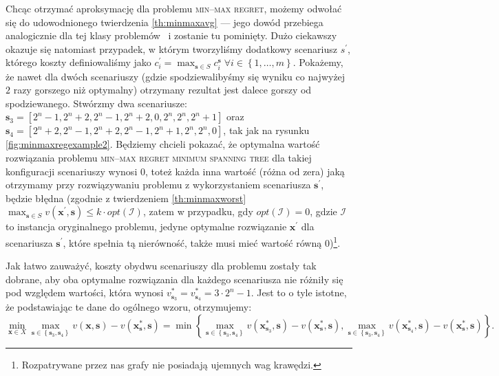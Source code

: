 Chcąc otrzymać aproksymację dla problemu \textsc{min--max regret}, możemy odwołać się do udowodnionego twierdzenia \ref{th:minmaxavg} --- jego dowód przebiega analogicznie dla tej klasy problemów~\cite[$430$]{minmaxSurvey} i zostanie tu pominięty. Dużo ciekawszy okazuje się natomiast przypadek, w którym tworzyliśmy dodatkowy scenariusz $s^{\prime}$, którego koszty definiowaliśmy jako $c^{\prime}_{i} = \max_{\textbf{s} \in S} c^{\textbf{s}}_{i} \; \forall i \in \left\{ 1, \dots, m \right\}$. Pokażemy, że nawet dla dwóch scenariuszy (gdzie spodziewalibyśmy się wyniku co najwyżej $2$ razy gorszego niż optymalny) otrzymany rezultat jest dalece gorszy od spodziewanego. Stwórzmy dwa scenariusze: $\textbf{s}_{3} = \left[ 2^{n} - 1, 2^{n} + 2, 2^{n} - 1, 2^{n} + 2, 0, 2^{n}, 2^{n}, 2^{n} + 1 \right]$ oraz $\textbf{s}_{4} = \left[ 2^{n} + 2, 2^{n} - 1, 2^{n} + 2, 2^{n} - 1, 2^{n} + 1, 2^{n}, 2^{n}, 0 \right]$, tak jak na rysunku \ref{fig:minmaxregexample2}. Będziemy chcieli pokazać, że optymalna wartość rozwiązania problemu \textsc{min--max regret minimum spanning tree} dla takiej konfiguracji scenariuszy wynosi $0$, toteż każda inna wartość (różna od zera) jaką otrzymamy przy rozwiązywaniu problemu z wykorzystaniem scenariusza $\textbf{s}^{\prime}$, będzie błędna (zgodnie z twierdzeniem \ref{th:minmaxworst} $\max_{\textbf{s} \in S} v \left( \textbf{x}^{\prime}, \textbf{s} \right) \leqslant k \cdot opt \left( \mathcal{I} \right)$, zatem w przypadku, gdy $opt \left( \mathcal{I} \right) = 0$, gdzie $\mathcal{I}$ to instancja oryginalnego problemu, jedyne optymalne rozwiązanie $\textbf{x}^{\prime}$ dla scenariusza $\textbf{s}^{\prime}$, które spełnia tą nierówność, także musi mieć wartość równą $0$)\footnote{Rozpatrywane przez nas grafy nie posiadają ujemnych wag krawędzi.}. 

Jak łatwo zauważyć, koszty obydwu scenariuszy dla problemu zostały tak dobrane, aby oba optymalne rozwiązania dla każdego scenariusza nie różniły się pod względem wartości, która wynosi $v^{\ast}_{\textbf{s}_{3}} = v^{\ast}_{\textbf{s}_{4}} = 3 \cdot 2^{n} - 1$. Jest to o tyle istotne, że podstawiając te dane do ogólnego wzoru, otrzymujemy:
\begin{equation}\label{eq:minmaxreg}
	\min_{\textbf{x} \in X} \max_{\textbf{s} \in \left\{ \textbf{s}_{3}, \textbf{s}_{4} \right\}} v \left( \textbf{x}, \textbf{s} \right) - v \left( \textbf{x}^{\ast}_{\textbf{s}}, \textbf{s} \right) = \min \left\{   \max_{\textbf{s} \in \left\{ \textbf{s}_{3}, \textbf{s}_{4} \right\}} v \left( \textbf{x}^{\ast}_{\textbf{s}_{3}}, \textbf{s} \right) - v \left( \textbf{x}^{\ast}_{\textbf{s}}, \textbf{s} \right), \max_{\textbf{s} \in \left\{ \textbf{s}_{3}, \textbf{s}_{4} \right\}} v \left( \textbf{x}^{\ast}_{\textbf{s}_{4}}, \textbf{s} \right) - v \left( \textbf{x}^{\ast}_{\textbf{s}}, \textbf{s} \right) \right\}\text{.}
\end{equation}


